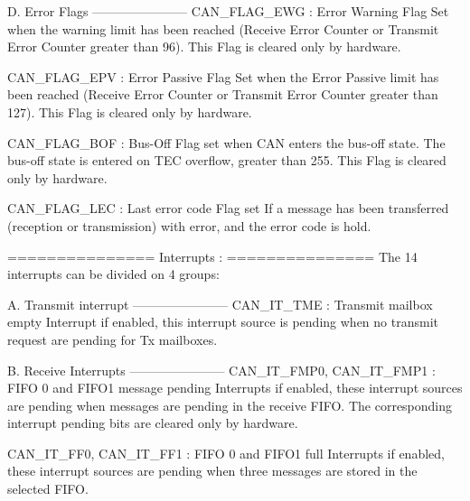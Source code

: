 \begin{DoxyVerb}
  D. Error Flags
  ----------------------- 
        CAN_FLAG_EWG    : Error Warning Flag
                          Set when the warning limit has been reached (Receive 
                          Error Counter or Transmit Error Counter greater than 96). 
                          This Flag is cleared only by hardware.
                            
        CAN_FLAG_EPV    : Error Passive Flag
                          Set when the Error Passive limit has been reached 
                          (Receive Error Counter or Transmit Error Counter 
                          greater than 127).
                          This Flag is cleared only by hardware.
                             
        CAN_FLAG_BOF    : Bus-Off Flag
                          set when CAN enters the bus-off state. The bus-off 
                          state is entered on TEC overflow, greater than 255.
                          This Flag is cleared only by hardware.
                                   
        CAN_FLAG_LEC    : Last error code Flag
                          set If a message has been transferred (reception or
                          transmission) with error, and the error code is hold.              
                          
  ===============  
   Interrupts :
  ===============
  The 14 interrupts can be divided on 4 groups: 
  
   A. Transmit interrupt
  -----------------------   
          CAN_IT_TME   :  Transmit mailbox empty Interrupt
                          if enabled, this interrupt source is pending when 
                          no transmit request are pending for Tx mailboxes.      

   B. Receive Interrupts
  -----------------------          
        CAN_IT_FMP0,
        CAN_IT_FMP1    :  FIFO 0 and FIFO1 message pending Interrupts
                          if enabled, these interrupt sources are pending when 
                          messages are pending in the receive FIFO.
                          The corresponding interrupt pending bits are cleared 
                          only by hardware.
                
        CAN_IT_FF0,              
        CAN_IT_FF1     :  FIFO 0 and FIFO1 full Interrupts
                          if enabled, these interrupt sources are pending when
                          three messages are stored in the selected FIFO.
        

\end{DoxyVerb}
